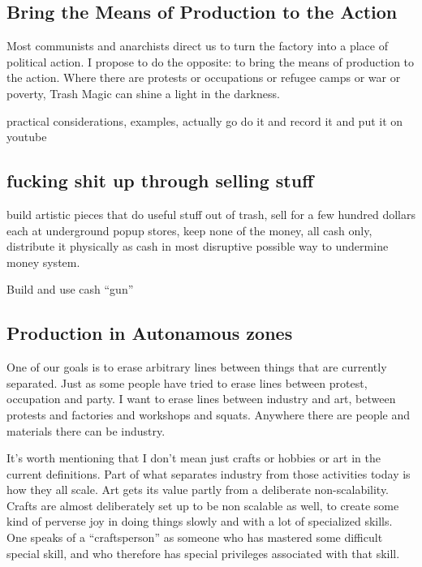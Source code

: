 \subsection{Bring the Means of Production to the
Action}\label{bring-the-means-of-production-to-the-action}

Most communists and anarchists direct us to turn the factory into a
place of political action. I propose to do the opposite: to bring the
means of production to the action. Where there are protests or
occupations or refugee camps or war or poverty, Trash Magic can shine a
light in the darkness.

practical considerations, examples, actually go do it and record it and
put it on youtube

\subsection{fucking shit up through selling
stuff}\label{fucking-shit-up-through-selling-stuff}

build artistic pieces that do useful stuff out of trash, sell for a few
hundred dollars each at underground popup stores, keep none of the
money, all cash only, distribute it physically as cash in most
disruptive possible way to undermine money system.

Build and use cash ``gun''

\subsection{Production in Autonamous
zones}\label{production-in-autonamous-zones}

One of our goals is to erase arbitrary lines between things that are
currently separated. Just as some people have tried to erase lines
between protest, occupation and party. I want to erase lines between
industry and art, between protests and factories and workshops and
squats. Anywhere there are people and materials there can be industry.

It's worth mentioning that I don't mean just crafts or hobbies or art in
the current definitions. Part of what separates industry from those
activities today is how they all scale. Art gets its value partly from a
deliberate non-scalability. Crafts are almost deliberately set up to be
non scalable as well, to create some kind of perverse joy in doing
things slowly and with a lot of specialized skills. One speaks of a
``craftsperson'' as someone who has mastered some difficult special
skill, and who therefore has special privileges associated with that
skill.

